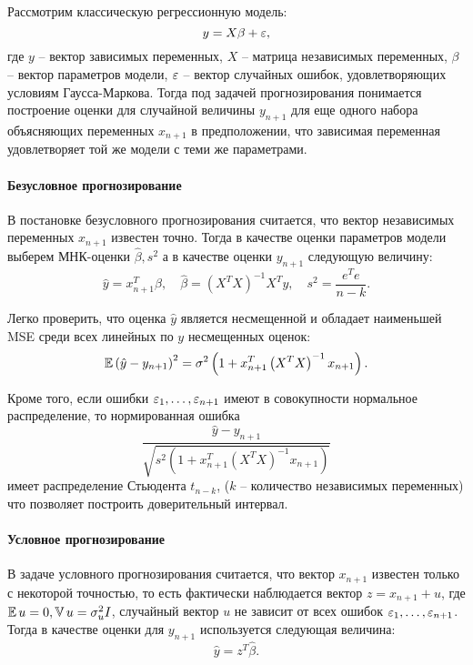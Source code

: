 
Рассмотрим классическую регрессионную модель:
\begin{equation*}
    y = X \beta + \varepsilon,
\end{equation*}
где $y$ -- вектор зависимых переменных, $X$ -- матрица независимых переменных, $\beta$ -- вектор параметров модели, $\varepsilon$ -- вектор случайных ошибок, удовлетворяющих условиям Гаусса-Маркова.
Тогда под задачей прогнозирования понимается построение оценки для случайной величины $y_{n+1}$ для еще одного набора объясняющих переменных $x_{n+1}$ в предположении, что зависимая переменная удовлетворяет той же модели с теми же параметрами.

\paragraph{Безусловное прогнозирование}
В постановке безусловного прогнозирования считается, что вектор независимых переменных $x_{n+1}$ известен точно.
Тогда в качестве оценки параметров модели выберем МНК-оценки $\hat\beta, s^2$ а в качестве оценки $y_{n+1}$ следующую величину:
\begin{equation*}
    \hat{y} = x_{n+1}^T \hat\beta, \quad \hat\beta = \left( X^T X \right)^{-1} X^T y, \quad s^2 = \frac{e^T e}{n-k}.
\end{equation*}

Легко проверить, что оценка $\hat{y}$ является несмещенной и обладает наименьшей MSE среди всех линейных по $y$ несмещенных оценок:
\begin{equation*}
    \operatorname{\mathbb{E}} \left( \hat{y} - y_{n+1} \right)^2 =
    \sigma^2 \left( 1 + x_{n+1}^T \left( X^T X \right)^{-1} x_{n+1} \right).
\end{equation*}

Кроме того, если ошибки $\varepsilon_1, \dots, \varepsilon_{n+1}$ имеют в совокупности нормальное распределение, то нормированная ошибка
\begin{equation*}
    \frac{\hat{y} - y_{n+1}}{\sqrt{s^2 \left( 1 + x_{n+1}^T \left( X^T X \right)^{-1} x_{n+1} \right)}}
\end{equation*}
имеет распределение Стьюдента $t_{n-k}$, ($k$ -- количество независимых переменных) что позволяет построить доверительный интервал.


\paragraph{Условное прогнозирование}
В задаче условного прогнозирования считается, что вектор $x_{n+1}$ известен только с некоторой точностью, то есть фактически наблюдается вектор $z = x_{n+1} + u$, где $\operatorname{\mathbb{E}} u = 0, \operatorname{\mathbb{V}} u = \sigma_u^2 I$, случайный вектор $u$ не зависит от всех ошибок $\varepsilon_1, \dots, \varepsilon_{n+1}$.
Тогда в качестве оценки для $y_{n+1}$ используется следующая величина:
\begin{equation*}
    \hat{y} = z^T \hat\beta.
\end{equation*}

